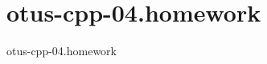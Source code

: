 \chapter{otus-\/cpp-\/04.homework}
\hypertarget{md_README}{}\label{md_README}
\label{md_README_autotoc_md0}%
%
otus-\/cpp-\/04.\+homework 